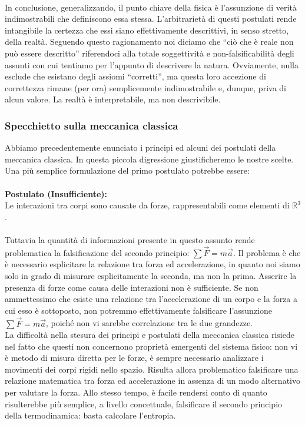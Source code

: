 \documentclass[]{article}
\begin{document}
	\\
	In conclusione, generalizzando, il punto chiave della fisica è l'assunzione di verità indimostrabili che definiscono essa stessa. L'arbitrarietà di questi postulati rende intangibile la certezza che essi siano effettivamente descrittivi, in senso stretto, della realtà. Seguendo questo ragionamento noi diciamo che \enquote{ciò che è reale non può essere descritto} riferendoci alla totale soggettività e non-falsificabilità degli assunti con cui tentiamo per l'appunto di descrivere la natura. Ovviamente, nulla esclude che esistano degli assiomi \enquote{corretti}, ma questa loro accezione di correttezza rimane (per ora) semplicemente indimostrabile e, dunque, priva di alcun valore. La realtà è interpretabile, ma non descrivibile.
	
	\subsubsection{Specchietto sulla meccanica classica}
	Abbiamo precedentemente enunciato i principi ed alcuni dei postulati della meccanica classica. In questa piccola digressione giustificheremo le nostre scelte. \\
	Una più semplice formulazione del primo postulato potrebbe essere:\\\\
	\textbf{Postulato (Insufficiente):}\\
	Le interazioni tra corpi sono causate da forze, rappresentabili come elementi di $\mathbb{R}^3$.
	\\\\
	Tuttavia la quantità di informazioni presente in questo assunto rende problematica la falsificazione del secondo principio: $\sum\vec{F}=m\vec{a}$. Il problema è che è necessario esplicitare la relazione tra forza ed accelerazione, in quanto noi siamo solo in grado di misurare esplicitamente la seconda, ma non la prima. Asserire la presenza di forze come causa delle interazioni non è sufficiente. Se non ammettessimo che esiste	una relazione tra l'accelerazione di un corpo e la forza a cui esso è sottoposto, non potremmo effettivamente falsificare l'assunzione $\sum\vec{F}=m\vec{a}$, poiché non vi sarebbe correlazione tra le due grandezze.\\
	La difficoltà nella stesura dei principi e postulati della meccanica classica risiede nel fatto che questi non concernono proprietà emergenti del sistema fisico: non vi è metodo di misura diretta per le forze, è sempre necessario analizzare i movimenti dei corpi rigidi nello spazio. Risulta allora problematico falsificare una relazione matematica tra forza ed accelerazione in assenza di un modo alternativo per valutare la forza. Allo stesso tempo, è facile rendersi conto di quanto risulterebbe più semplice, a livello concettuale, falsificare il secondo principio della termodinamica: basta calcolare l'entropia.\\
\end{document}
